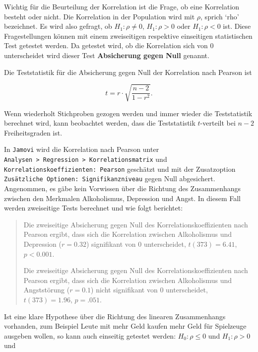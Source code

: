 \documentclass[
]{book}
\theoremstyle{definition}
\theoremstyle{definition}
\theoremstyle{definition}
\theoremstyle{definition}
\theoremstyle{remark}
\begin{document}
Wichtig für die Beurteilung der Korrelation ist die Frage, ob eine Korrelation besteht oder nicht. Die Korrelation in der Population wird mit \(\rho\), sprich `rho' bezeichnet. Es wird also gefragt, ob \(H_1: \rho \neq 0\), \(H_1: \rho > 0\) oder \(H_1: \rho < 0\) ist. Diese Fragestellungen können mit einem zweiseitigen respektive einseitigen statistischen Test getestet werden. Da getestet wird, ob die Korrelation sich von \(0\) unterscheidet wird dieser Test \label{customdef-podukt-moment-absichern-null}{\textbf{Absicherung gegen Null}} genannt.

Die Teststatistik für die Absicherung gegen Null der Korrelation nach Pearson ist

\begin{equation}
t = r\cdot \sqrt{\frac{n-2}{1-r^2}}.
\label{eq:absichern-pearson}
\end{equation}

Wenn wiederholt Stichproben gezogen werden und immer wieder die Teststatistik berechnet wird, kann beobachtet werden, dass die Teststatistik \(t\)-verteilt bei \(n-2\) Freiheitsgraden ist.

In \texttt{Jamovi} wird die Korrelation nach Pearson unter \texttt{Analysen\ \textgreater{}\ Regression\ \textgreater{}\ Korrelationsmatrix} und \texttt{Korrelationskoeffizienten:\ Pearson} geschätzt und mit der Zusatzoption \texttt{Zusätzliche\ Optionen:\ Signifikanzniveau} gegen Null abgesichert. Angenommen, es gäbe kein Vorwissen über die Richtung des Zusammenhangs zwischen den Merkmalen Alkoholismus, Depression und Angst. In diesem Fall werden zweiseitige Tests berechnet und wie folgt berichtet:

\begin{quote}
Die zweiseitige Absicherung gegen Null des Korrelationskoeffizienten nach Pearson ergibt, dass sich die Korrelation zwischen Alkoholismus und Depression (\(r = 0.32\)) signifikant von \(0\) unterscheidet, \(t(373) = 6.41\), \(p < 0.001\).

Die zweiseitige Absicherung gegen Null des Korrelationskoeffizienten nach Pearson ergibt, dass sich die Korrelation zwischen Alkoholismus und Angststörung (\(r = 0.1\)) nicht signifikant von \(0\) unterscheidet, \(t(373) = 1.96\), \(p = .051\).
\end{quote}

Ist eine klare Hypothese über die Richtung des linearen Zusammenhangs vorhanden, zum Beispiel Leute mit mehr Geld kaufen mehr Geld für Spielzeuge ausgeben wollen, so kann auch einseitig getestet werden: \(H_0: \rho \leq 0\) und \(H_1: \rho > 0\) und
\end{document}
